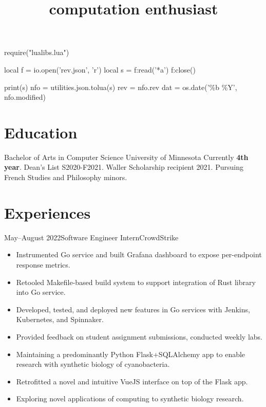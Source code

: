 \documentclass{moderncv}
\title{computation enthusiast}
\begin{document}
\begin{luacode}
require("lualibs.lua")

local f = io.open('rev.json', 'r')
local s = f:read('*a')
f:close()

print(s)
nfo = utilities.json.tolua(s)
rev = nfo.rev
dat = os.date('\%b \%Y', nfo.modified)
\end{luacode}

\newcommand{\githash}
{
  \href{https://github.com/tnytown/website/blob/\luadirect{tex.sprint(rev)}/cv.tex}
  {\texttt{\luadirect{tex.sprint(rev)}}}}
\newcommand{\lastmodified}{\luadirect{tex.sprint(dat)}}

\makecvtitle{}
\vspace*{-15mm} %

\section{Education}
{Bachelor of Arts in Computer Science}
{University of Minnesota}
{}{}
{
  Currently \textbf{4th year}. Dean's List S2020-F2021. Waller Scholarship recipient 2021. Pursuing French Studies and Philosophy minors.
}

\section{Experiences}

\cventry
    {May--August 2022}{Software Engineer Intern}{CrowdStrike}{}{}
    {
      \begin{itemize}[label=\rightarrow,noitemsep]
      \item Instrumented Go service and built Grafana dashboard to expose per-endpoint response metrics.
      \item Retooled Makefile-based build system to support integration of Rust library into Go service.
      \item Developed, tested, and deployed new features in Go services with Jenkins, Kubernetes, and Spinnaker.
      \end{itemize}
    }

{
  \begin{itemize}[label=\rightarrow,noitemsep]
  \item Provided feedback on student assignment submissions, conducted weekly labs.
  \end{itemize}
}
{
  \begin{itemize}[label=\rightarrow,noitemsep]
  \item Maintaining a predominantly Python Flask+SQLAlchemy app to enable research with synthetic biology of cyanobacteria.
  \item Retrofitted a novel and intuitive VueJS interface on top of the Flask app.
  \item Exploring novel applications of computing to synthetic biology research.
  \end{itemize}
}
   
\end{document}
